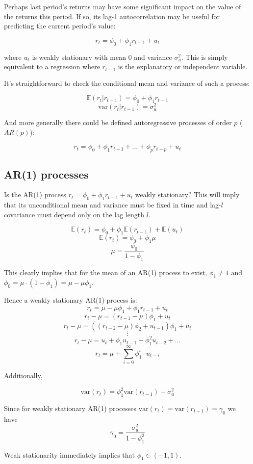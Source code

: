 \documentclass[11pt,]{article}
\begin{document}
Perhaps last period's returns may have some significant impact on the
value of the returns this period. If so, its lag-1 autocorrelation may
be useful for predicting the current period's value:

\[r_t = \phi_0+\phi_1r_{t-1}+u_t\]

where \(u_t\) is weakly stationary with mean 0 and variance
\(\sigma^2_u\). This is simply equivalent to a regression where
\(r_{t-1}\) is the explanatory or independent variable.

It's straightforward to check the conditional mean and variance of such
a process:

\[\mathbb{E}(r_t|r_{t-1}) = \phi_0+\phi_1r_{t-1}\]
\[\text{var}(r_t|r_{t-1}) = \sigma_u^2\]

And more generally there could be defined autoregressive processes of
order \(p\) (\(AR(p)\)):

\[r_t=\phi_0+\phi_1r_{t-1}+\hdots+\phi_pr_{t-p} + u_t\]

\subsection{AR(1) processes}\label{ar1-processes}

Is the AR(1) process \(r_t=\phi_0+\phi_1r_{t-1}+u_t\) weakly stationary?
This will imply that its unconditional mean and variance must be fixed
in time and lag-\(l\) covariance must depend only on the lag length
\(l\).

\[\mathbb{E}(r_t) = \phi_0 + \phi_1\mathbb{E}(r_{t-1})+\mathbb{E}(u_t)\]
\[\mathbb{E}(r_t) = \phi_0 + \phi_1\mu\]
\[\mu = \frac{\phi_0}{1-\phi_1}\]

This clearly implies that for the mean of an AR(1) process to exist,
\(\phi_1\neq 1\) and \(\phi_0=\mu\cdot(1-\phi_1)=\mu-\mu\phi_1\).

Hence a weakly stationary AR(1) process is:
\[r_t=\mu-\mu\phi_1+\phi_1r_{t-1}+u_t\]
\[r_t-\mu=(r_{t-1}-\mu)\phi_1+u_t\]
\[r_t-\mu=((r_{t-2}-\mu)\phi_2+u_{t-1})\phi_1+u_t\] \[\vdots\]
\[r_t-\mu = u_t + \phi_1u_{t-1}+\phi_1^2u_{t-2}+\hdots\]
\[r_t=\mu+\sum_{i=0}^\infty\phi_1^i\cdot u_{t-i}\]

Additionally,

\[\text{var}(r_t)=\phi_1^2\text{var}(r_{t-1})+\sigma^2_u\]

Since for weakly stationary AR(1) processes
\(\text{var}(r_t)=\text{var}(r_{t-1})=\gamma_0\) we have
\[\gamma_0 = \frac{\sigma_u^2}{1-\phi_1^2}\]

Weak stationarity immediately implies that \(\phi_1\in(-1,1)\).
\end{document}
